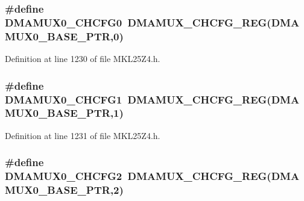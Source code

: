 \subsubsection[{\texorpdfstring{D\+M\+A\+M\+U\+X0\+\_\+\+C\+H\+C\+F\+G0}{DMAMUX0_CHCFG0}}]{\setlength{\rightskip}{0pt plus 5cm}\#define D\+M\+A\+M\+U\+X0\+\_\+\+C\+H\+C\+F\+G0~{\bf D\+M\+A\+M\+U\+X\+\_\+\+C\+H\+C\+F\+G\+\_\+\+R\+EG}({\bf D\+M\+A\+M\+U\+X0\+\_\+\+B\+A\+S\+E\+\_\+\+P\+TR},0)}\hypertarget{group___d_m_a_m_u_x___register___accessor___macros_gafbdd08eec205390f76af0e1e2aa323cf}{}\label{group___d_m_a_m_u_x___register___accessor___macros_gafbdd08eec205390f76af0e1e2aa323cf}


Definition at line 1230 of file M\+K\+L25\+Z4.\+h.

\subsubsection[{\texorpdfstring{D\+M\+A\+M\+U\+X0\+\_\+\+C\+H\+C\+F\+G1}{DMAMUX0_CHCFG1}}]{\setlength{\rightskip}{0pt plus 5cm}\#define D\+M\+A\+M\+U\+X0\+\_\+\+C\+H\+C\+F\+G1~{\bf D\+M\+A\+M\+U\+X\+\_\+\+C\+H\+C\+F\+G\+\_\+\+R\+EG}({\bf D\+M\+A\+M\+U\+X0\+\_\+\+B\+A\+S\+E\+\_\+\+P\+TR},1)}\hypertarget{group___d_m_a_m_u_x___register___accessor___macros_ga8c0edd8cf3e5d5f046ceb4df69c8724b}{}\label{group___d_m_a_m_u_x___register___accessor___macros_ga8c0edd8cf3e5d5f046ceb4df69c8724b}


Definition at line 1231 of file M\+K\+L25\+Z4.\+h.

\subsubsection[{\texorpdfstring{D\+M\+A\+M\+U\+X0\+\_\+\+C\+H\+C\+F\+G2}{DMAMUX0_CHCFG2}}]{\setlength{\rightskip}{0pt plus 5cm}\#define D\+M\+A\+M\+U\+X0\+\_\+\+C\+H\+C\+F\+G2~{\bf D\+M\+A\+M\+U\+X\+\_\+\+C\+H\+C\+F\+G\+\_\+\+R\+EG}({\bf D\+M\+A\+M\+U\+X0\+\_\+\+B\+A\+S\+E\+\_\+\+P\+TR},2)}\hypertarget{group___d_m_a_m_u_x___register___accessor___macros_gaa1b0bee7c4b71acced055cef09768a29}{}\label{group___d_m_a_m_u_x___register___accessor___macros_gaa1b0bee7c4b71acced055cef09768a29}


